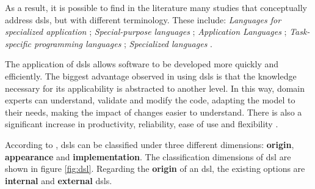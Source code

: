 As a result, it is possible to find in the literature many studies that conceptually address \acp{dsl}, but with different terminology.
These include: \textit{Languages for specialized application} \cite{Sammet:1972}; \textit{Special-purpose languages} \cite{Wexelblat:1978}; \textit{Application Languages} \cite{Martin:1982}; \textit{Task-specific programming languages} \cite{Nardi:1993}; \textit{Specialized languages} \cite{Bergin:1996}.
    
The application of \acp{dsl} allows software to be developed more quickly and efficiently.
The biggest advantage observed in using \acp{dsl} is that the knowledge necessary for its applicability is abstracted to another level.
In this way, domain experts can understand, validate and modify the code, adapting the model to their needs, making the impact of changes easier to understand.
There is also a significant increase in productivity, reliability, ease of use and flexibility \cite{Gronback:2009, vanDeursen:2000}.

According to \cite{Mernik:2005}, \acp{dsl} can be classified under three different dimensions: \textbf{origin}, \textbf{appearance} and \textbf{implementation}.
The classification dimensions of \ac{dsl} are shown in figure \ref{fig:dsl}.
Regarding the \textbf{origin} of an \ac{dsl}, the existing options are \textbf{internal} and \textbf{external} \acp{dsl}.


